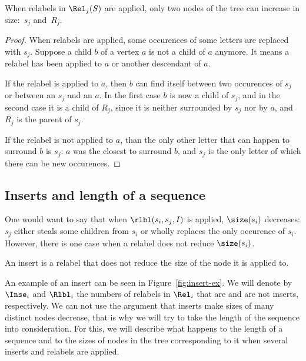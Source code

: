 \begin{lemma} \label{lm:srreceive}
	When relabels in $\Rel_j (S)$ are applied, only two nodes of the tree can increase in size:~$s_j$ and~$R_j$.
\end{lemma}

\begin{proof} When relabels are applied, some occurences of some letters are replaced with $s_j$. Suppose a child $b$ of a vertex $a$ is not a child of $a$ anymore. It means a relabel has been applied to $a$ or another descendant of $a$.

	If the relabel is applied to $a$, then $b$ can find itself between two occurences of $s_j$ or between an $s_j$ and an $a$. In the first case $b$ is now a child of $s_j$, and in the second case it is a child of $R_j$, since it is neither surrounded by $s_j$ nor by $a$, and $R_j$ is the parent of $s_j$.

	If the relabel is not applied to $a$, than the only other letter that can happen to surround $b$ is $s_j$: $a$ was the closest to surround $b$, and $s_j$ is the only letter of which there can be new occurences. \end{proof}

\subsection{Inserts and length of a \Ds sequence}

One would want to say that when $\rlbl (s_i, s_j, I)$ is applied, $\size (s_i)$ decreases: $s_j$ either steals some children from $s_i$ or wholly replaces the only occurence of $s_i$. However, there is one case when a relabel does not reduce $\size (s_i)$.



\begin{definition}
	An insert is a relabel that does not reduce the size of the node it is applied to.
\end{definition}

An example of an insert can be seen in Figure~\ref{fig:insert-ex}. We will denote by $\Inse_i$ and $\Rlbl_i$ the numbers of relabels in $\Rel_i$ that are and are not inserts, respectively. We can not use the argument that inserts make sizes of many distinct nodes decrease, that is why we will try to take the length of the \Ds sequence into consideration. For this, we will describe what happens to the length of a sequence and to the sizes of nodes in the tree corresponding to it when several inserts and relabels are applied.

